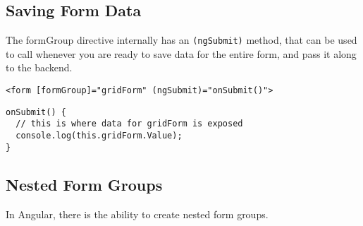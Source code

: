 \subsection{Saving Form Data}
The formGroup directive internally has an \lstinline{(ngSubmit)} method, that 
can be used to call whenever you are ready to save data for the entire form, 
and pass it along to the backend. 
\begin{lstlisting}[caption=code-form.component.html]
<form [formGroup]="gridForm" (ngSubmit)="onSubmit()">
\end{lstlisting}

\begin{lstlisting}[caption=grid-form.component.ts]
onSubmit() {
  // this is where data for gridForm is exposed
  console.log(this.gridForm.Value);
}
\end{lstlisting}

\subsection{ Nested Form Groups }
In Angular, there is the ability to create nested form groups. 